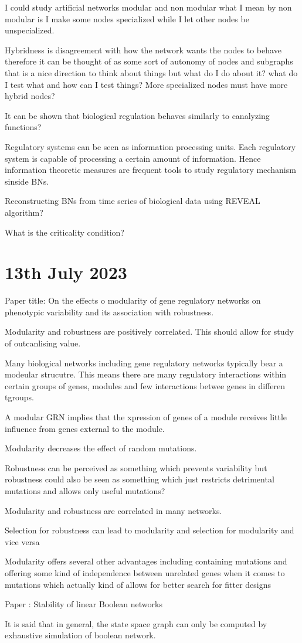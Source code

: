\documentclass{article}
\begin{document}
I could study artificial networks modular and non modular what I mean by non modular is I make some nodes specialized while I let other nodes be unspecialized. 


Hybridness is disagreement with how the network wants the nodes to behave therefore it can be thought of as some sort of autonomy of nodes and subgraphs that is a nice direction to think about things but what do I do about it? what do I test what and how can I test things? More specialized nodes must have more hybrid nodes? 

 
It can be shown that biological regulation behaves similarly to canalyzing functions? 


Regulatory systems can be seen as information processing units. Each regulatory system is capable of processing a certain amount of information. Hence information theoretic measures are frequent tools to study regulatory mechanism sinside BNs.


Reconstructing BNs from time series of biological data using REVEAL algorithm?

What is the criticality condition?




\section{13th July 2023}
Paper title: On the effects o modularity of gene regulatory networks on phenotypic variability and its association with robustness. 


Modularity and robustness are positively correlated. This should allow for study of outcanlising value. 


Many biological networks including gene regulatory networks typically bear a modeular strucutre. This means there are many regulatory interactions within certain groups of genes, modules and few interactions betwee genes in differen tgroups. 

A modular GRN implies that the xpression of genes of a module receives little influence from genes external to the module. 


Modularity decreases the effect of random mutations. 


Robustness can be perceived as something which prevents variability but robustness could also be seen as something which just restricts detrimental mutations and allows only useful mutations? 

Modularity and robustness are correlated in many networks. 

Selection for robustness can lead to modularity and selection for modularity and vice versa 

Modularity offers several other advantages including containing mutations and offering some kind of independence between unrelated genes when it comes to mutations which actually kind of allows for better search for fitter designs 



Paper : Stability of linear Boolean networks

It is said that in general, the state space graph can only be computed by exhaustive simulation of boolean network. 
\end{document}
